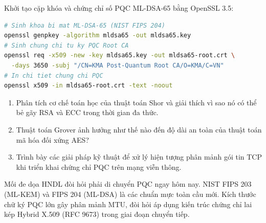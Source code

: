 \begin{chayngay}
Khởi tạo cặp khóa và chứng chỉ số PQC ML-DSA-65 bằng OpenSSL 3.5:
\begin{lstlisting}[language=bash]
# Sinh khoa bi mat ML-DSA-65 (NIST FIPS 204)
openssl genpkey -algorithm mldsa65 -out mldsa65.key
# Sinh chung chi tu ky PQC Root CA
openssl req -x509 -new -key mldsa65.key -out mldsa65-root.crt \
  -days 3650 -subj "/CN=KMA Post-Quantum Root CA/O=KMA/C=VN"
# In chi tiet chung chi PQC
openssl x509 -in mldsa65-root.crt -text -noout
\end{lstlisting}
\end{chayngay}

\begin{tukiemtra}
\begin{enumerate}
  \item Phân tích cơ chế toán học của thuật toán Shor và giải thích vì sao nó có thể bẻ gãy RSA và ECC trong thời gian đa thức.
  \item Thuật toán Grover ảnh hưởng như thế nào đến độ dài an toàn của thuật toán mã hóa đối xứng AES?
  \item Trình bày các giải pháp kỹ thuật để xử lý hiện tượng phân mảnh gói tin TCP khi triển khai chứng chỉ PQC trên mạng viễn thông.
\end{enumerate}
\end{tukiemtra}

\begin{kbox}
Mối đe dọa HNDL đòi hỏi phải di chuyển PQC ngay hôm nay. NIST FIPS 203 (ML-KEM) và FIPS 204 (ML-DSA) là các chuẩn mực toàn cầu mới. Kích thước chữ ký PQC lớn gây phân mảnh MTU, đòi hỏi áp dụng kiến trúc chứng chỉ lai kép Hybrid X.509 (RFC 9673) trong giai đoạn chuyển tiếp.
\end{kbox}
